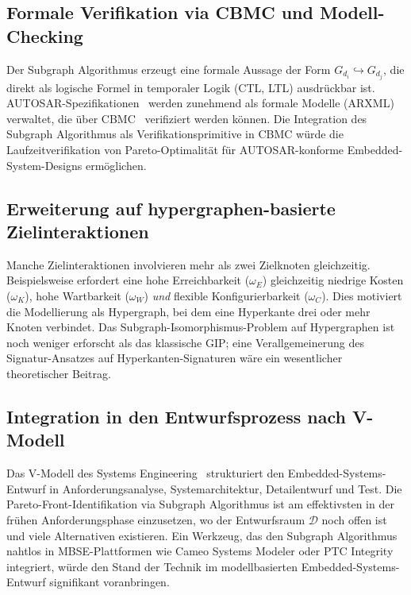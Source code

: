 ﻿\documentclass[a4paper,12pt]{article}
\theoremstyle{definition}
\begin{document}
\subsection{Formale Verifikation via CBMC und Modell-Checking}

Der Subgraph Algorithmus erzeugt eine formale Aussage der Form
$G_{d_i} \hookrightarrow G_{d_j}$, die direkt als logische Formel in
temporaler Logik (CTL, LTL) ausdr\"{u}ckbar ist.
AUTOSAR-Spezifikationen~\cite{autosar2021} werden zunehmend als
formale Modelle (ARXML) verwaltet, die \"{u}ber CBMC~\cite{kroening2014cbmc}
verifiziert werden k\"{o}nnen.
Die Integration des Subgraph Algorithmus als Verifikationsprimitive in
CBMC w\"{u}rde die Laufzeitverifikation von Pareto-Optimalit\"{a}t f\"{u}r
AUTOSAR-konforme Embedded-System-Designs erm\"{o}glichen.

\subsection{Erweiterung auf hypergraphen-basierte Zielinteraktionen}

Manche Zielinteraktionen involvieren mehr als zwei Zielknoten gleichzeitig.
Beispielsweise erfordert eine hohe Erreichbarkeit ($\omega_E$) gleichzeitig
niedrige Kosten ($\omega_K$), hohe Wartbarkeit ($\omega_W$) \emph{und}
flexible Konfigurierbarkeit ($\omega_C$).
Dies motiviert die Modellierung als Hypergraph, bei dem eine Hyperkante
drei oder mehr Knoten verbindet.
Das Subgraph-Isomorphismus-Problem auf Hypergraphen ist noch weniger
erforscht als das klassische GIP; eine Verallgemeinerung des
Signatur-Ansatzes auf Hyperkanten-Signaturen w\"{a}re ein wesentlicher
theoretischer Beitrag.

\subsection{Integration in den Entwurfsprozess nach V-Modell}

Das V-Modell des Systems Engineering~\cite{forsberg1991relationship}
strukturiert den Embedded-Systems-Entwurf in Anforderungsanalyse,
Systemarchitektur, Detailentwurf und Test.
Die Pareto-Front-Identifikation via Subgraph Algorithmus ist
am effektivsten in der fr\"{u}hen Anforderungsphase einzusetzen,
wo der Entwurfsraum $\mathcal{D}$ noch offen ist und viele Alternativen
existieren.
Ein Werkzeug, das den Subgraph Algorithmus nahtlos in
MBSE-Plattformen wie Cameo Systems Modeler oder PTC Integrity
integriert, w\"{u}rde den Stand der Technik im modellbasierten
Embedded-Systems-Entwurf signifikant voranbringen.
\end{document}
